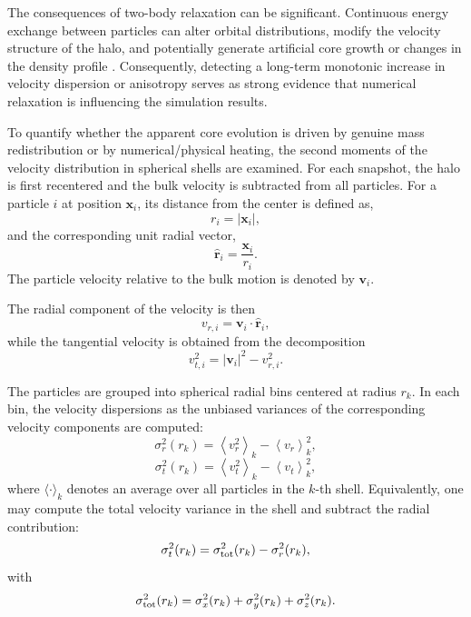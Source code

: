 The consequences of two-body relaxation can be significant. Continuous energy exchange between particles can alter orbital distributions, modify the velocity structure of the halo, and potentially generate artificial core growth or changes in the density profile \citep{elzant2006relaxation, baushev2013convergence}. Consequently, detecting a long-term monotonic increase in velocity dispersion or anisotropy serves as strong evidence that numerical relaxation is influencing the simulation results.

To quantify whether the apparent core evolution is driven by genuine mass redistribution or by numerical/physical heating, the second moments of the velocity distribution in spherical shells are examined. For each snapshot, the halo is first recentered and the bulk velocity is subtracted from all particles. For a particle $i$ at position $\boldsymbol{x}_i$, its distance from the center is defined as,
\begin{equation}
r_i = |\boldsymbol{x}_i| ,
\end{equation}
and the corresponding unit radial vector,
\begin{equation}
\hat{\boldsymbol{r}}_i = \frac{\boldsymbol{x}_i}{r_i}.
\end{equation}
The particle velocity relative to the bulk motion is denoted by $\boldsymbol{v}_i$.

The radial component of the velocity is then
\begin{equation}
v_{r,i} = \boldsymbol{v}_i \cdot \hat{\boldsymbol{r}}_i ,
\end{equation}
while the tangential velocity is obtained from the decomposition
\begin{equation}
v_{t,i}^2 = |\boldsymbol{v}_i|^2 - v_{r,i}^2 .
\end{equation}

The particles are grouped into spherical radial bins centered at radius $r_k$. In each bin, the velocity dispersions as the unbiased variances of the corresponding velocity components are computed:
\begin{equation}
\sigma_r^2(r_k) = \left\langle v_r^2 \right\rangle_k - \left\langle v_r \right\rangle_k^2 ,
\end{equation}
\begin{equation}
\sigma_t^2(r_k) = \left\langle v_t^2 \right\rangle_k - \left\langle v_t \right\rangle_k^2 ,
\end{equation}
where $\langle \cdot \rangle_k$ denotes an average over all particles in the $k$-th shell. Equivalently, one may compute the total velocity variance in the shell and subtract the radial contribution:
\begin{equation}
\sigma_t^2(r_k) = \sigma_{\rm tot}^2(r_k) - \sigma_r^2(r_k),
\end{equation}
with
\begin{equation}
\sigma_{\rm tot}^2(r_k) = \sigma_x^2(r_k) + \sigma_y^2(r_k) + \sigma_z^2(r_k).
\end{equation}

